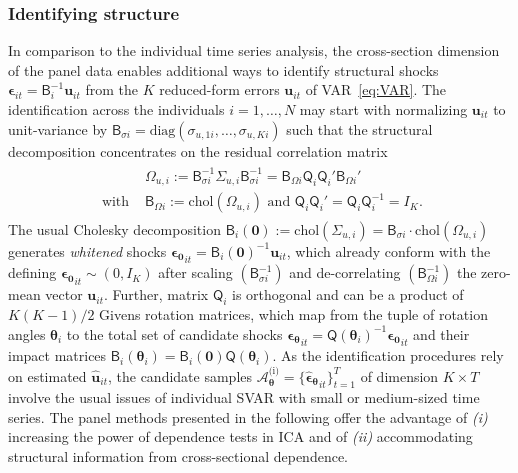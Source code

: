 \subsubsection{Identifying structure}
In comparison to the individual time series analysis, the cross-section dimension of the panel data enables additional ways to identify structural shocks $ \boldsymbol{\epsilon}_{it} = \mathsf{B}_i^{-1} \boldsymbol{u}_{it} $ from the $ K $ reduced-form errors $ \boldsymbol{u}_{it} $ of VAR~\eqref{eq:VAR}. The identification across the individuals $ i=1,\ldots,N $ may start with normalizing $ \boldsymbol{u}_{it} $ to unit-variance by $ \textsf{B}_{\sigma i} = \text{diag}\left( \sigma_{u,1i}, \ldots, \sigma_{u,Ki} \right) $ such that the structural decomposition concentrates on the residual correlation matrix
\begin{align}
\begin{split}
	&\Omega_{u,i} := \textsf{B}_{\sigma i}^{-1} \Sigma^{\ }_{u,i} \textsf{B}_{\sigma i}^{-1} = \textsf{B}_{\Omega i}^{\ } \mathsf{Q}_i^{\ } \mathsf{Q}_i' \textsf{B}_{\Omega i}' \\
	\text{ with } & \textsf{B}_{\Omega i} := \text{chol}\left( \Omega_{u,i} \right) \text{ and } \mathsf{Q}_i^{\ } \mathsf{Q}_i' = \mathsf{Q}_i^{\ } \mathsf{Q}_i^{-1} = I_K.
\end{split}
\end{align}
The usual Cholesky decomposition $ \textsf{B}_{i} \left( \boldsymbol{0} \right) := \text{chol}\left( \Sigma_{u,i} \right) = \textsf{B}_{\sigma i} \cdot \text{chol}\left( \Omega_{u,i} \right) $ generates \textit{whitened} shocks $ \boldsymbol{\epsilon_0}_{it} = \mathsf{B}_i \left( \boldsymbol{0} \right)^{-1} \boldsymbol{u}_{it} $, which already conform with the defining $ \boldsymbol{\epsilon_0}_{it} \sim ( 0, I_K ) $ after scaling $ \left( \textsf{B}_{\sigma i}^{-1} \right) $ and de-correlating $ \left( \textsf{B}_{\Omega i}^{-1} \right) $ the zero-mean vector $ \boldsymbol{u}_{it} $. Further, matrix $ \mathsf{Q}_i $ is orthogonal and can be a product of $ K(K-1)/2 $ Givens rotation matrices, which map from the tuple of rotation angles $ \boldsymbol{\theta}_i $ to the total set of candidate shocks $ \boldsymbol{\epsilon_\theta}_{it} = \mathsf{Q} \left( \boldsymbol{\theta}_i \right)^{-1} \boldsymbol{\epsilon_0}_{it} $ and their impact matrices $ \mathsf{B}_i \left( \boldsymbol{\theta}_i \right) = \textsf{B}_{i} \left( \boldsymbol{0} \right) \mathsf{Q} \left( \boldsymbol{\theta}_i \right) $. As the identification procedures rely on estimated $ \boldsymbol{\widehat{u}}_{it} $, the candidate samples $ \mathcal{A}_{\boldsymbol{\theta}}^{\text{(i)}} = \{ \boldsymbol{\widehat{\epsilon}_\theta}_{it} \}^T_{t=1} $ of dimension $ K \times T $ involve the usual issues of individual SVAR with small or medium-sized time series. The panel methods presented in the following offer the advantage of \textit{(i)} increasing the power of dependence tests in ICA and of \textit{(ii)} accommodating structural information from cross-sectional dependence.
